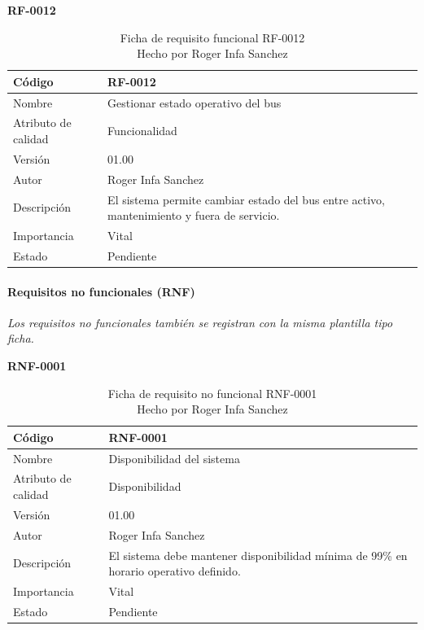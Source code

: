 \textbf{RF-0012}
\begin{longtable}{|p{}|p{}|}
\caption{Ficha de requisito funcional RF-0012\\Hecho por Roger Infa Sanchez} \\
\hline
Código & RF-0012 \\
\hline
Nombre & Gestionar estado operativo del bus \\
\hline
Atributo de calidad & Funcionalidad \\
\hline
Versión & 01.00 \\
\hline
Autor & Roger Infa Sanchez \\
\hline
Descripción & El sistema permite cambiar estado del bus entre activo, mantenimiento y fuera de servicio. \\
\hline
Importancia & Vital \\
\hline
Estado & Pendiente \\
\hline
\end{longtable}

\paragraph{Requisitos no funcionales (RNF)}
\textit{Los requisitos no funcionales también se registran con la misma plantilla tipo ficha.}

\textbf{RNF-0001}
\begin{longtable}{|p{}|p{}|}
\caption{Ficha de requisito no funcional RNF-0001\\Hecho por Roger Infa Sanchez} \\
\hline
Código & RNF-0001 \\
\hline
Nombre & Disponibilidad del sistema \\
\hline
Atributo de calidad & Disponibilidad \\
\hline
Versión & 01.00 \\
\hline
Autor & Roger Infa Sanchez \\
\hline
Descripción & El sistema debe mantener disponibilidad mínima de 99\% en horario operativo definido. \\
\hline
Importancia & Vital \\
\hline
Estado & Pendiente \\
\hline
\end{longtable}

